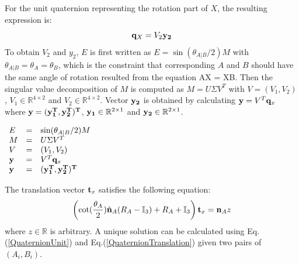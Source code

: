 \documentclass[twocolumn,10pt]{asme2ej}
\newcommand{\nn}{{\bf n}}
\newcommand{\ttt}{{\bf t}}
\newcommand{\qq}{{\bf q}}
\begin{document}
{\color{blue}
For the unit quaternion representing the rotation part of $X$, the resulting expression is: 
\begin{equation}
\qq_{X} = V_{2}\bf y_{2}
\label{QuaternionUnit}
\end{equation}
To obtain $V_{2}$ and $y_{2}$, $E$ is first written as $E =  \sin(\theta_{A|B}/2)M$ with $\theta_{A|B} = \theta_{A} = \theta_{B}$, which is the constraint that corresponding $A$ and $B$ should have the same angle of rotation resulted from the equation AX = XB. Then the singular value decomposition of $M$ is computed as $M = U\Sigma V^{T}$ with $V = (V_{1}, V_{2})$,  $V_{1} \in \mathbb{R}^{4 \times 2}$ and $V_{2} \in \mathbb{R}^{4 \times 2}$. Vector ${\bf y_{2}}$ is obtained by calculating ${\bf y} =  V^{T}\qq_{x}$ where $\bf y = (\bf y^{T}_{1},\bf y^{T}_{2} )^{T}$, ${\bf y_{1}} \in \mathbb{R}^{2 \times 1}$ and ${\bf y_{2}} \in \mathbb{R}^{2 \times 1}$.\\

\begin{center}
$\begin{array}{lcl}
E & = & \sin(\theta_{A|B}/2)M\\
M & = & U\Sigma V^{T}\\
V & = & (V_{1}, V_{2})\\
\bf y & = & V^{T}\qq_{x}\\
\bf y & = & (\bf y^{T}_{1},\bf y^{T}_{2} )^{T}
\end{array}$
\end{center}
}
The translation vector $\ttt_{x}$ satisfies the following equation:
\begin{equation}
\left(\cot(\dfrac{\theta_{A}}{2})\hat{\nn}_{A}(R_{A}-\mathbb{I}_{3})+ R_{A} + \mathbb{I}_{3}\right)\ttt_{x} = \nn_{A}z
\label{QuaternionTranslation} 
\end{equation}
where $z \in \mathbb{R}$ is arbitrary. A unique solution can be calculated using Eq.(\ref{QuaternionUnit}) and Eq.(\ref{QuaternionTranslation}) given two pairs of $(A_{i}, B_{i})$.
\end{document}
